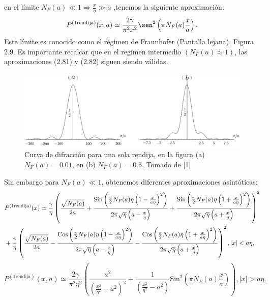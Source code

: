 en el límite $N_F(a)\ll 1\Rightarrow \frac{x}{\eta}\gg a$ ,tenemos la siguiente aproximación:
\begin{equation}
P^{(\text{1rendija})}(x,a)\simeq\frac{2\gamma}{\pi^{2}x^{2}}\sen^{2}\left(\pi N_{F}(a)\frac{x}{a}\right) .
\end{equation}
Este límite es conocido como el régimen de Fraunhofer (Pantalla lejana), Figura 2.9. Es importante recalcar que en el regimen intermedio $(N_F(a)\approx 1)$, las aproximaciones (2.81) y (2.82) siguen siendo válidas.
\begin{figure}[h]
\centering
\includegraphics[width=14cm]{Imagenes/Fig9}
\caption[Patron de interferencia, 1 rendija, regimen de Fraunhofer]{Curva de difracción para una sola rendija, en la figura (a) $N_F(a)=0.01$, en (b) $N_F(a)=0.5$. Tomado de [1]}
\end{figure}
Sin embargo para $N_F(a)\ll 1$, obtenemos diferentes aproximaciones asintóticas:
\begin{eqnarray}
\nonumber &P^{(\text{1rendija})}(x)\simeq\frac{\gamma}{\eta}\left(\frac{\sqrt{N_{F}(a)}}{2a}+\frac{\text{\text{Sin}}\left(\frac{\pi}{2}N_{F}(a)\eta\left(1-\frac{x}{a\eta}\right)^{2}\right)}{2\pi\sqrt{\eta}\left(a-\frac{x}{\eta}\right)}+\frac{\text{\text{Sin}}\left(\frac{\pi}{2}N_{F}(a)\eta\left(1+\frac{x}{a\eta}\right)^{2}\right)}{2\pi\sqrt{\eta}\left(a+\frac{x}{\eta}\right)}\right)^{2}\\
&+\frac{\gamma}{\eta}\left(\frac{\sqrt{N_{F}(a)}}{2a}-\frac{\text{\text{Cos}}\left(\frac{\pi}{2}N_{F}(a)\eta\left(1-\frac{x}{a\eta}\right)^{2}\right)}{2\pi\sqrt{\eta}\left(a-\frac{x}{\eta}\right)}-\frac{\text{\text{Cos}}\left(\frac{\pi}{2}N_{F}(a)\eta\left(1+\frac{x}{a\eta}\right)^{2}\right)}{2\pi\sqrt{\eta}\left(a+\frac{x}{\eta}\right)}\right)^{2},|x|<a\eta ,
\end{eqnarray}
\begin{equation}
P^{(\text{1rendija})}(x,a)\simeq\frac{2\gamma}{\pi^{2}\eta^{2}}\left(\frac{a^{2}}{\left(\frac{x^{2}}{\eta^{2}}-a^{2}\right)^{2}}+\frac{1}{\left(\frac{x^{2}}{\eta^{2}}-a^{2}\right)}\text{Sin}^{2}\left(\pi N_{F}(a)\frac{x}{a}\right)\right), |x|>a\eta .
\end{equation}
